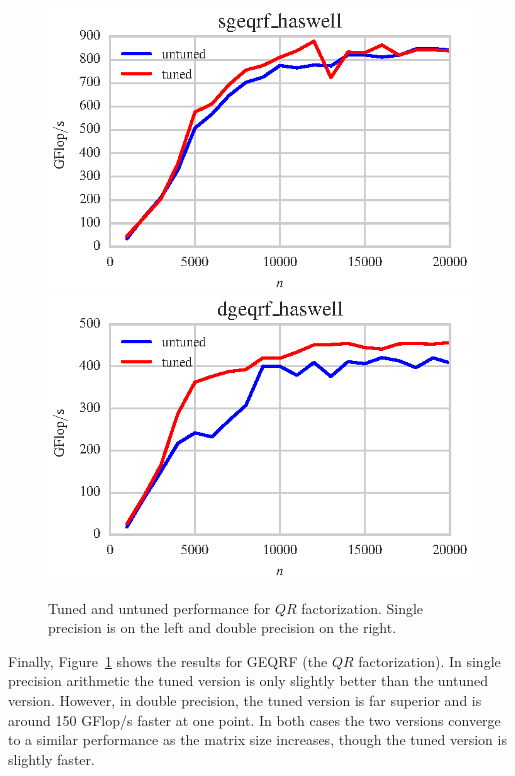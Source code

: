 \documentclass[a4paper,12pt]{article}
\begin{document}
\begin{figure}[ht]
  \centering
  \includegraphics[scale=0.85]{fig/tuned_sgeqrf.eps}
  \includegraphics[scale=0.85]{fig/tuned_dgeqrf.eps}
  \caption{Tuned and untuned performance for $QR$ factorization. Single
    precision is on the left and double precision on the right.
    \label{fig.tuned_geqrf} }
\end{figure}

Finally,
Figure~\ref{fig.tuned_geqrf} shows the results
for GEQRF (the $QR$ factorization).
In single precision arithmetic the tuned version
is only slightly better than the untuned version.
However,
in double precision,
the tuned version is far superior and is around 150 GFlop/s
faster at one point.
In both cases the two versions converge to a similar
performance as the matrix size increases,
though the tuned version is slightly faster.
\end{document}
